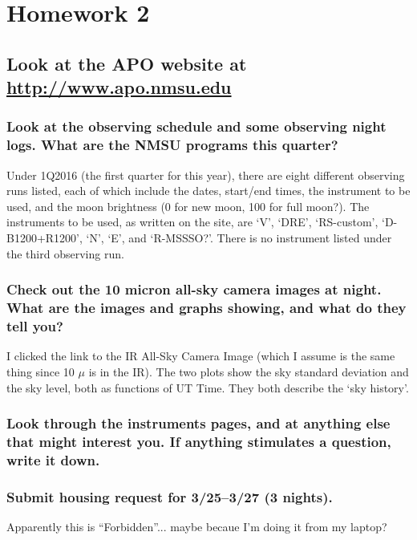 \documentclass[12pt]{article}
\begin{document}
\section*{Homework 2}
\subsection*{Look at the APO website at
\textcolor{blue}{\url{http://www.apo.nmsu.edu}}}

\subsubsection*{Look at the observing schedule and some observing night logs.
    What are the NMSU programs this quarter?}

    Under 1Q2016 (the first quarter for this year), there are eight different
    observing runs listed, each of which include the dates, start/end times,
    the instrument to be used, and the moon brightness (0 for new moon,
    100 for full moon?).
    The instruments to be used, as written on the site, are
    `V', `DRE', `RS-custom', `D-B1200+R1200', `N', `E', and `R-MSSSO?'.
    There is no instrument listed under the third observing run.


\subsubsection*{Check out the 10 micron all-sky camera images at night. What are
    the images and graphs showing, and what do they tell you?}

    I clicked the link to the IR All-Sky Camera Image (which I assume is the
    same thing since 10 $\mu$ is in the IR). The two plots show the sky
    standard deviation and the sky level, both as functions of UT Time.
    They both describe the `sky history'.


\subsubsection*{Look through the instruments pages, and at anything else that might
    interest you. If anything stimulates a question, write it down.}

\subsubsection*{Submit housing request for 3/25--3/27 (3 nights).}

    Apparently this is ``Forbidden''... maybe becaue I'm doing it from my
    laptop?
\end{document}
